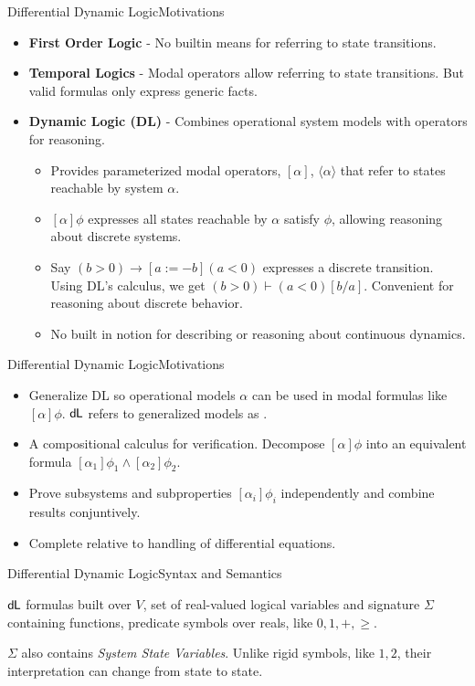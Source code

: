 \documentclass{beamer}
\newcommand{\dL}{\text{\upshape\textsf{d{\kern-0.05em}L}}}
\begin{document}
\begin{frame}{Differential Dynamic Logic}{Motivations}
  \begin{itemize}
    \item \textbf{First Order Logic} - No builtin means for referring to state
      transitions.
    \item \textbf{Temporal Logics} - Modal operators allow referring to state transitions.
      But valid formulas only express generic facts.
      \pause
    \item \textbf{Dynamic Logic (DL)} - Combines operational system models with
      operators for reasoning.
      \begin{itemize}
        \item Provides parameterized modal operators, $[\alpha]$,
          $\langle\alpha\rangle$
          that refer to states reachable by system $\alpha$.
        \item $[\alpha]\phi$ expresses all states reachable by $\alpha$ satisfy
          $\phi$, allowing reasoning about discrete systems.
        \item Say $(b > 0) \to [a := -b] (a < 0) $ expresses a
          discrete transition. Using DL's calculus, we get $(b > 0) \vdash (a < 0)
          [ b / a ]$. Convenient for  reasoning about discrete behavior.
        \pause
        \item No built in notion for describing or reasoning about continuous dynamics.
      \end{itemize}
  \end{itemize}
\end{frame}

\begin{frame}{Differential Dynamic Logic}{Motivations}
  \begin{itemize}
    \item Generalize DL so operational models $\alpha$ can be
      used in modal formulas like $[\alpha]\phi$. $\dL$ refers to
      generalized models as .
    \item A compositional calculus for verification. Decompose
      $[\alpha]\phi$ into an equivalent formula $[\alpha_1]\phi_1 \wedge
      [\alpha_2]\phi_2$.
    \item Prove subsystems and subproperties $[\alpha_i]\phi_i$ independently
      and combine results conjuntively.
    \item Complete relative to handling of differential equations.
  \end{itemize}
\end{frame}

\begin{frame}{Differential Dynamic Logic}{Syntax and Semantics}
  \begin{description}
    \item{} $\dL$ formulas built over $V$, set of real-valued logical variables and
     signature $\Sigma$ containing functions, predicate symbols over reals, like
     $0, 1, +, \geq$.
  \item {}$\Sigma$ also contains \textit{System State Variables}. Unlike rigid
   symbols, like $1, 2$, their interpretation can change from state to state.
  \end{description}
\end{frame}
\end{document}
